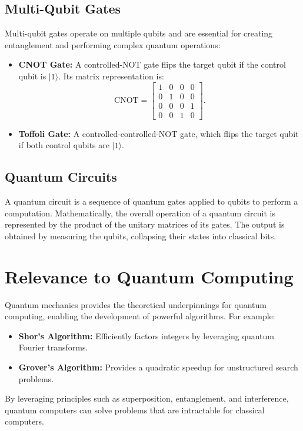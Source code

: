 \documentclass[12pt,a4paper]{report}
\begin{document}
\subsection{Multi-Qubit Gates}
Multi-qubit gates operate on multiple qubits and are essential for creating entanglement and performing complex quantum operations:
\begin{itemize}
    \item \textbf{CNOT Gate:} A controlled-NOT gate flips the target qubit if the control qubit is \( |1\rangle \). Its matrix representation is:
    \[
    \text{CNOT} = \begin{bmatrix}
    1 & 0 & 0 & 0 \\
    0 & 1 & 0 & 0 \\
    0 & 0 & 0 & 1 \\
    0 & 0 & 1 & 0
    \end{bmatrix}.
    \]
    \item \textbf{Toffoli Gate:} A controlled-controlled-NOT gate, which flips the target qubit if both control qubits are \( |1\rangle \).
\end{itemize}

\subsection{Quantum Circuits}
A quantum circuit is a sequence of quantum gates applied to qubits to perform a computation. Mathematically, the overall operation of a quantum circuit is represented by the product of the unitary matrices of its gates. The output is obtained by measuring the qubits, collapsing their states into classical bits.

\section{Relevance to Quantum Computing}
Quantum mechanics provides the theoretical underpinnings for quantum computing, enabling the development of powerful algorithms. For example:
\begin{itemize}
    \item \textbf{Shor's Algorithm:} Efficiently factors integers by leveraging quantum Fourier transforms.
    \item \textbf{Grover's Algorithm:} Provides a quadratic speedup for unstructured search problems.
\end{itemize}
By leveraging principles such as superposition, entanglement, and interference, quantum computers can solve problems that are intractable for classical computers.
\end{document}
